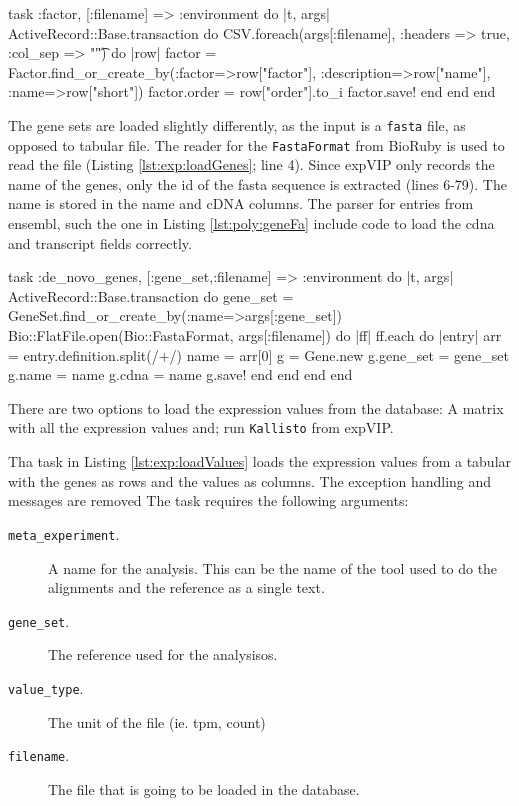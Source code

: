 \begin{code}[language=ruby, caption={[Load factors]Task that loads factors}, label=lst:exp:laodFactor]
task :factor, [:filename] => :environment do |t, args|
  ActiveRecord::Base.transaction do 
    CSV.foreach(args[:filename], :headers => true, :col_sep => "\t") do |row|
      factor = Factor.find_or_create_by(:factor=>row["factor"],  :description=>row["name"],  :name=>row["short"])
      factor.order = row["order"].to_i
      factor.save!
    end
  end
end
\end{code}

The gene sets are loaded slightly differently, as the input is a \verb|fasta| file, as opposed to tabular file. 
The reader for the \verb|FastaFormat| from BioRuby \citep{Goto2010} is used to read the file (Listing \ref{lst:exp:loadGenes}; line 4). 
Since expVIP only records the name of the genes, only the id of the fasta sequence is extracted (lines 6-79). 
The name is stored in the name and cDNA columns. 
The parser for entries from ensembl, such the one in Listing \ref{lst:poly:geneFa} include code to load the \acrshort{cdna} and transcript fields correctly. 

\begin{code}[language=ruby, caption={[Load genes from Fasta]Task that load genes from a Fasta File}, label=lst:exp:loadGenes]
task :de_novo_genes, [:gene_set,:filename] => :environment do |t, args|
  ActiveRecord::Base.transaction do
    gene_set = GeneSet.find_or_create_by(:name=>args[:gene_set])
    Bio::FlatFile.open(Bio::FastaFormat, args[:filename]) do |ff|
      ff.each do |entry| 
        arr = entry.definition.split(/\s+/)
        name = arr[0]
        g = Gene.new 
        g.gene_set = gene_set
        g.name = name
        g.cdna = name
        g.save!
      end
    end
  end
end
\end{code}

There are two options to load the expression values from the database: A matrix with all the expression values and; run \verb|Kallisto| from expVIP. 

Tha task in Listing \ref{lst:exp:loadValues} loads the expression values from a tabular with the genes as rows and the values as columns. 
The exception handling and messages are removed 
The task requires the following arguments:

\begin{description}
\item[\texttt{meta\_experiment}.] A name for the analysis. This can be the name of the tool used to do the alignments and the reference as a single text. 
\item[\texttt{gene\_set}.] The reference used for the analysisos. 
\item[\texttt{value\_type}.] The unit of the file (ie.  \acrshort{tpm}, count)
\item[\texttt{filename}.] The file that is going to be loaded in the database. 
\end{description}

